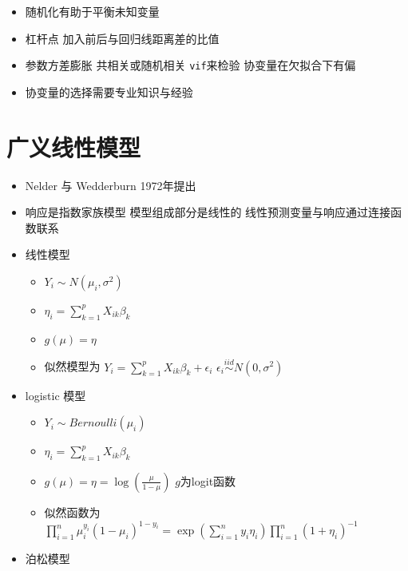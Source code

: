 \documentclass[]{book}
\providecommand{\tightlist}{%
  \setlength{\itemsep}{0pt}\setlength{\parskip}{0pt}}
\begin{document}
\begin{itemize}
\tightlist
\item
  随机化有助于平衡未知变量
\item
  杠杆点 加入前后与回归线距离差的比值
\item
  参数方差膨胀 共相关或随机相关 \texttt{vif}来检验 协变量在欠拟合下有偏
\item
  协变量的选择需要专业知识与经验
\end{itemize}

\hypertarget{ux5e7fux4e49ux7ebfux6027ux6a21ux578b}{%
\section{广义线性模型}\label{ux5e7fux4e49ux7ebfux6027ux6a21ux578b}}

\begin{itemize}
\tightlist
\item
  Nelder 与 Wedderburn 1972年提出
\item
  响应是指数家族模型 模型组成部分是线性的 线性预测变量与响应通过连接函数联系
\item
  线性模型

  \begin{itemize}
  \tightlist
  \item
    \(Y_i \sim N(\mu_i, \sigma^2)\)
  \item
    \(\eta_i = \sum_{k=1}^p X_{ik} \beta_k\)
  \item
    \(g(\mu) = \eta\)
  \item
    似然模型为 \(Y_i = \sum_{k=1}^p X_{ik} \beta_k + \epsilon_{i}\) \(\epsilon_i \stackrel{iid}{\sim} N(0, \sigma^2)\)
  \end{itemize}
\item
  logistic 模型

  \begin{itemize}
  \tightlist
  \item
    \(Y_i \sim Bernoulli(\mu_i)\)
  \item
    \(\eta_i = \sum_{k=1}^p X_{ik} \beta_k\)
  \item
    \(g(\mu) = \eta = \log\left( \frac{\mu}{1 - \mu}\right)\) \(g\)为logit函数
  \item
    似然函数为 \(\prod_{i=1}^n \mu_i^{y_i} (1 - \mu_i)^{1-y_i} = \exp\left(\sum_{i=1}^n y_i \eta_i \right) \prod_{i=1}^n (1 + \eta_i)^{-1}\)
  \end{itemize}
\item
  泊松模型


\end{itemize}
\end{document}

